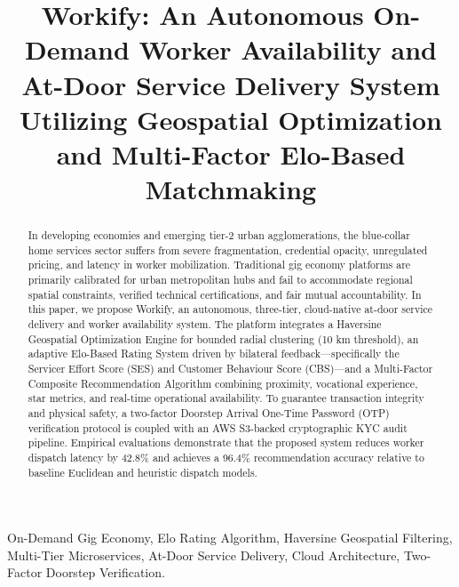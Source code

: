 \documentclass[conference]{IEEEtran}
\begin{document}
\title{Workify: An Autonomous On-Demand Worker Availability and At-Door Service Delivery System Utilizing Geospatial Optimization and Multi-Factor Elo-Based Matchmaking}

\author{
}

\maketitle

\begin{abstract}
In developing economies and emerging tier-2 urban agglomerations, the blue-collar home services sector suffers from severe fragmentation, credential opacity, unregulated pricing, and latency in worker mobilization. Traditional gig economy platforms are primarily calibrated for urban metropolitan hubs and fail to accommodate regional spatial constraints, verified technical certifications, and fair mutual accountability. In this paper, we propose Workify, an autonomous, three-tier, cloud-native at-door service delivery and worker availability system. The platform integrates a Haversine Geospatial Optimization Engine for bounded radial clustering (10 km threshold), an adaptive Elo-Based Rating System driven by bilateral feedback—specifically the Servicer Effort Score (SES) and Customer Behaviour Score (CBS)—and a Multi-Factor Composite Recommendation Algorithm combining proximity, vocational experience, star metrics, and real-time operational availability. To guarantee transaction integrity and physical safety, a two-factor Doorstep Arrival One-Time Password (OTP) verification protocol is coupled with an AWS S3-backed cryptographic KYC audit pipeline. Empirical evaluations demonstrate that the proposed system reduces worker dispatch latency by 42.8\% and achieves a 96.4\% recommendation accuracy relative to baseline Euclidean and heuristic dispatch models.
\end{abstract}

\begin{IEEEkeywords}
On-Demand Gig Economy, Elo Rating Algorithm, Haversine Geospatial Filtering, Multi-Tier Microservices, At-Door Service Delivery, Cloud Architecture, Two-Factor Doorstep Verification.
\end{IEEEkeywords}
\end{document}
